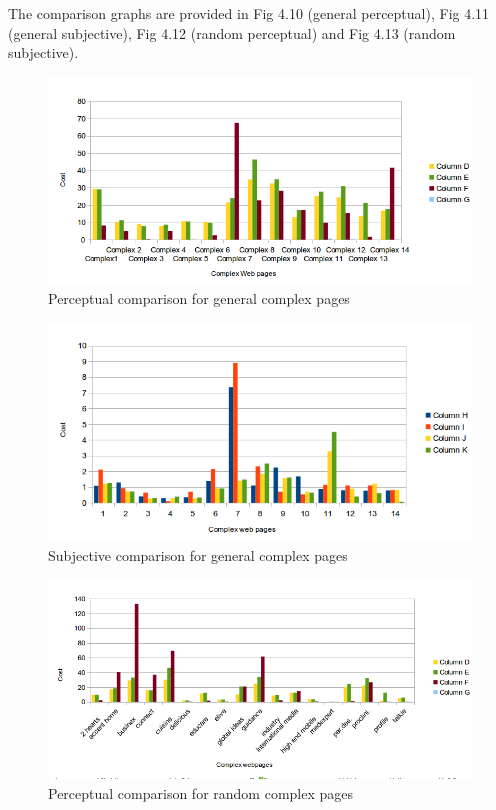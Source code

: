 The comparison graphs are provided in Fig 4.10 (general perceptual), Fig 4.11 (general subjective), Fig 4.12 (random perceptual) and Fig 4.13 (random subjective).


\begin{figure}[!htb]
\centering
  \includegraphics[width=\linewidth]{complexGP.png}
  \caption{Perceptual comparison for general complex pages}
  \label{fig:sub1}
\end{figure}

\begin{figure}[!htb]
  \centering
  \includegraphics[width=\linewidth]{complexGS.png}
\caption{Subjective comparison for general complex pages}
\label{fig:test}
\end{figure}


\begin{figure}[!htb]
\centering
  \includegraphics[width=\linewidth]{complexRP.png}
  \caption{Perceptual comparison for random complex pages}
  \label{fig:sub1}
\end{figure}

